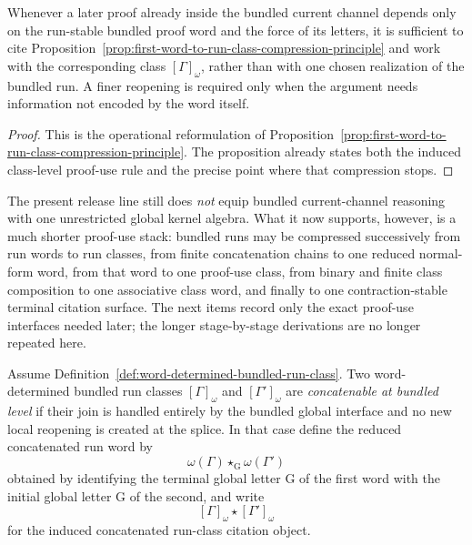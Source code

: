 \begin{corollary}
\label{cor:use-rule-for-the-first-word-to-run-class-compression-principle}
Whenever a later proof already inside the bundled current channel depends only on the run-stable bundled proof word and the force of its letters, it is sufficient to cite Proposition~\ref{prop:first-word-to-run-class-compression-principle} and work with the corresponding class $[\Gamma]_{\omega}$, rather than with one chosen realization of the bundled run. A finer reopening is required only when the argument needs information not encoded by the word itself.
\end{corollary}

\begin{proof}
This is the operational reformulation of Proposition~\ref{prop:first-word-to-run-class-compression-principle}. The proposition already states both the induced class-level proof-use rule and the precise point where that compression stops.
\end{proof}




\begin{remark}
\label{rem:status-of-the-first-run-class-concatenation-step}
The present release line still does \emph{not} equip bundled current-channel reasoning with one unrestricted global kernel algebra. What it now supports, however, is a much shorter proof-use stack: bundled runs may be compressed successively from run words to run classes, from finite concatenation chains to one reduced normal-form word, from that word to one proof-use class, from binary and finite class composition to one associative class word, and finally to one contraction-stable terminal citation surface. The next items record only the exact proof-use interfaces needed later; the longer stage-by-stage derivations are no longer repeated here.
\end{remark}

\begin{definition}
\label{def:concatenable-word-determined-bundled-run-classes}
Assume Definition~\ref{def:word-determined-bundled-run-class}. Two word-determined bundled run classes $[\Gamma]_{\omega}$ and $[\Gamma']_{\omega}$ are \emph{concatenable at bundled level} if their join is handled entirely by the bundled global interface and no new local reopening is created at the splice. In that case define the reduced concatenated run word by
\[
\omega(\Gamma)\star_{\mathrm G}\omega(\Gamma')
\]
obtained by identifying the terminal global letter $\mathrm G$ of the first word with the initial global letter $\mathrm G$ of the second, and write
\[
[\Gamma]_{\omega}\star[\Gamma']_{\omega}
\]
for the induced concatenated run-class citation object.
\end{definition}

